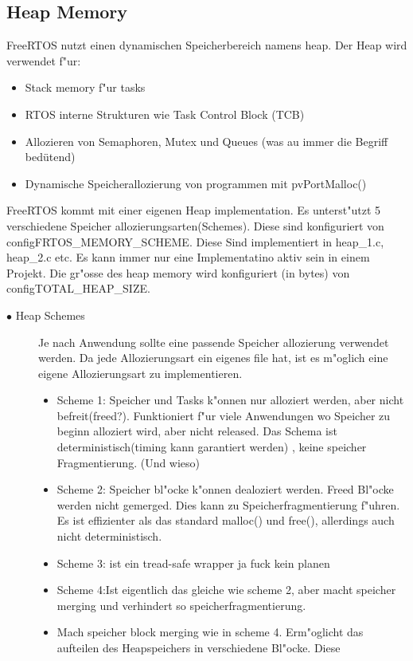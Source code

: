 \documentclass[a4paper, 8pt]{extarticle}
\begin{document}
\begin{multicols*}{3}
				\subsection{Heap Memory}
				FreeRTOS nutzt einen dynamischen Speicherbereich namens heap. Der Heap wird verwendet f"ur:
				\begin{itemize}
					\item Stack memory f"ur tasks
					\item RTOS interne Strukturen wie Task Control Block (TCB)
					\item Allozieren von Semaphoren, Mutex und Queues (was au immer die Begriff bedütend)
					\item Dynamische Speicherallozierung von programmen mit pvPortMalloc()
				\end{itemize}
				FreeRTOS kommt mit einer eigenen Heap implementation. Es unterst"utzt 5 verschiedene Speicher allozierungsarten(Schemes). Diese sind konfiguriert 
				von configFRTOS\_MEMORY\_SCHEME. Diese Sind implementiert in heap\_1.c, heap\_2.c etc. 
				Es kann immer nur eine Implementatino aktiv sein in einem Projekt.
				Die gr"osse des heap memory wird konfiguriert (in bytes) von configTOTAL\_HEAP\_SIZE.
				\begin{description}
					\item[$\bullet$ Heap Schemes]
					 Je nach Anwendung sollte eine passende Speicher allozierung verwendet werden. Da jede Allozierungsart ein eigenes file hat, 
					 ist es m"oglich eine eigene Allozierungsart zu implementieren.
					 \begin{itemize}
						\item Scheme 1: Speicher und Tasks k"onnen nur alloziert werden, aber nicht befreit(freed?). Funktioniert f"ur viele Anwendungen
							  wo Speicher zu beginn alloziert wird, aber nicht released. Das Schema ist deterministisch(timing kann garantiert werden)
							  , keine speicher Fragmentierung. (Und wieso)
						\item Scheme 2: Speicher bl"ocke k"onnen dealoziert werden. Freed Bl"ocke werden nicht gemerged. Dies kann zu Speicherfragmentierung f"uhren.
							  Es ist effizienter als das standard malloc() und free(), allerdings auch nicht deterministisch.
						\item Scheme 3: ist ein tread-safe wrapper ja fuck kein planen
						\item Scheme 4:Ist eigentlich das gleiche wie scheme 2, aber macht speicher merging und verhindert so speicherfragmentierung.
						\item Mach speicher block merging wie in scheme 4. Erm"oglicht das aufteilen des Heapspeichers in verschiedene Bl"ocke. Diese

\end{itemize}
\end{description}
\end{multicols*}
\end{document}
